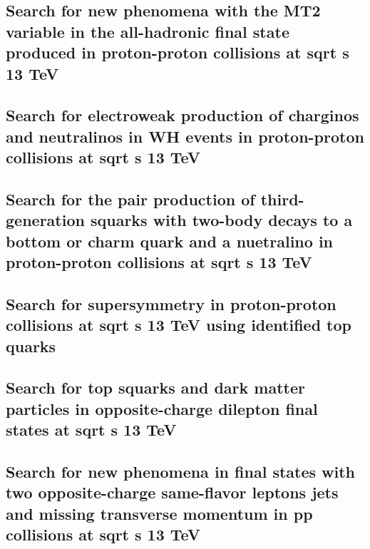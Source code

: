 \documentclass[a4paper, 11pt, twoside, openright]{report}
\begin{document}
\subsection{Search for new phenomena with the MT2 variable in the all-hadronic final state produced in proton-proton collisions at sqrt s 13 TeV}


\subsection{Search for electroweak production of charginos and neutralinos in WH events in proton-proton collisions at sqrt s 13 TeV}


\subsection{Search for the pair production of third-generation squarks with two-body decays to a bottom or charm quark and a nuetralino in proton-proton collisions at sqrt s 13 TeV}


\subsection{Search for supersymmetry in proton-proton collisions at sqrt s 13 TeV using identified top quarks}


\subsection{Search for top squarks and dark matter particles in opposite-charge dilepton final states at sqrt s 13 TeV}


\subsection{Search for new phenomena in final states with two opposite-charge same-flavor leptons jets and missing transverse momentum in pp collisions at sqrt s 13 TeV}

\end{document}
